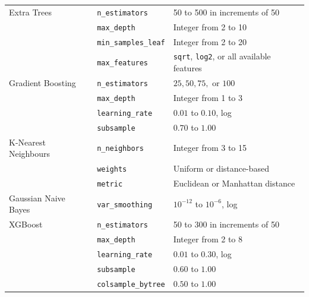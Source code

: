 \documentclass[12pt,twocolumn]{article}
\begin{document}
\begin{table}[htbp]
\begin{tabularx}{\textwidth}{p{3.0cm} p{3.4cm} X}
\midrule

Extra Trees
& \texttt{n\_estimators}
& 50 to 500 in increments of 50 \\

& \texttt{max\_depth}
& Integer from 2 to 10 \\

& \texttt{min\_samples\_leaf}
& Integer from 2 to 20 \\

& \texttt{max\_features}
& \texttt{sqrt}, \texttt{log2}, or all available features \\

\midrule

Gradient Boosting
& \texttt{n\_estimators}
& \(25, 50, 75,\) or \(100\) \\

& \texttt{max\_depth}
& Integer from 1 to 3 \\

& \texttt{learning\_rate}
& \(0.01\) to \(0.10\), log \\

& \texttt{subsample}
& \(0.70\) to \(1.00\) \\

\midrule

K-Nearest Neighbours
& \texttt{n\_neighbors}
& Integer from 3 to 15 \\

& \texttt{weights}
& Uniform or distance-based \\

& \texttt{metric}
& Euclidean or Manhattan distance \\

\midrule

Gaussian Naive Bayes
& \texttt{var\_smoothing}
& \(10^{-12}\) to \(10^{-6}\), log \\

\midrule

XGBoost
& \texttt{n\_estimators}
& 50 to 300 in increments of 50 \\

& \texttt{max\_depth}
& Integer from 2 to 8 \\

& \texttt{learning\_rate}
& \(0.01\) to \(0.30\), log \\

& \texttt{subsample}
& \(0.60\) to \(1.00\) \\

& \texttt{colsample\_bytree}
& \(0.50\) to \(1.00\) \\


\end{tabularx}
\end{table}
\end{document}

